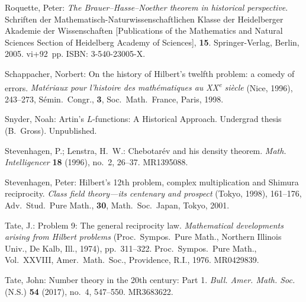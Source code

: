 \noindent Roquette, Peter: \emph{The Brauer--Hasse--Noether theorem in historical perspective}. Schriften der Mathematisch-Naturwissenschaftlichen Klasse der Heidelberger Akademie der Wissenschaften [Publications of the Mathematics and Natural Sciences Section of Heidelberg Academy of Sciences], \textbf{15}. Springer-Verlag, Berlin, 2005. vi+92~pp. ISBN: 3-540-23005-X.\par\medskip

\noindent Schappacher, Norbert: On the history of Hilbert's twelfth problem: a comedy of errors. \emph{Mat\'eriaux pour l'histoire des math\'ematiques au XX\textsuperscript{e} si\`ecle} (Nice, 1996), 243--273, S\'emin.~Congr., \textbf{3}, Soc.~Math.~France, Paris, 1998.\par\medskip

\noindent Snyder, Noah: Artin's $L$-functions: A Historical Approach. Undergrad thesis (B.~Gross). Unpublished.\par\medskip

\noindent Stevenhagen, P.; Lenstra, H.~W.: Chebotar\'ev and his density theorem. \emph{Math. Intelligencer} \textbf{18} (1996), no.~2, 26--37. MR1395088.\par\medskip

\noindent Stevenhagen, Peter: Hilbert's 12th problem, complex multiplication and Shimura reciprocity. \emph{Class field theory---its centenary and prospect} (Tokyo, 1998), 161--176, Adv.~Stud.~Pure Math., \textbf{30}, Math.~Soc.~Japan, Tokyo, 2001.\par\medskip

\noindent Tate, J.: Problem 9: The general reciprocity law. \emph{Mathematical developments arising from Hilbert problems} (Proc.~Sympos.~Pure Math., Northern Illinois Univ., De Kalb, Ill., 1974), pp.~311--322. Proc.~Sympos.~Pure Math., Vol.~XXVIII, Amer.~Math.~Soc., Providence, R.I., 1976. MR0429839.\par\medskip

\noindent Tate, John: Number theory in the 20th century: Part 1. \emph{Bull. Amer. Math. Soc.} (N.S.) \textbf{54} (2017), no.~4, 547--550. MR3683622.

